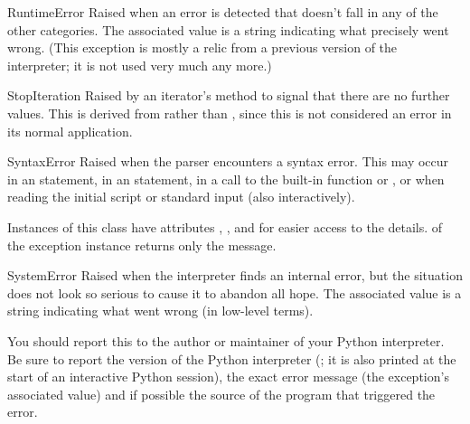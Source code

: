 \begin{excdesc}{RuntimeError}
  Raised when an error is detected that doesn't fall in any of the
  other categories.  The associated value is a string indicating what
  precisely went wrong.  (This exception is mostly a relic from a
  previous version of the interpreter; it is not used very much any
  more.)
\end{excdesc}

\begin{excdesc}{StopIteration}
  Raised by an iterator's  method to signal that there
  are no further values.
  This is derived from  rather than
  , since this is not considered an error in
  its normal application.
\end{excdesc}


\begin{excdesc}{SyntaxError}
  Raised when the parser encounters a syntax error.  This may occur in
  an  statement, in an  statement, in a call
  to the built-in function  or , or
  when reading the initial script or standard input (also
  interactively).

  Instances of this class have attributes ,
  ,  and  for easier access
  to the details.   of the exception instance returns
  only the message.
\end{excdesc}

\begin{excdesc}{SystemError}
  Raised when the interpreter finds an internal error, but the
  situation does not look so serious to cause it to abandon all hope.
  The associated value is a string indicating what went wrong (in
  low-level terms).
  
  You should report this to the author or maintainer of your Python
  interpreter.  Be sure to report the version of the Python
  interpreter (; it is also printed at the start of an
  interactive Python session), the exact error message (the exception's
  associated value) and if possible the source of the program that
  triggered the error.
\end{excdesc}

